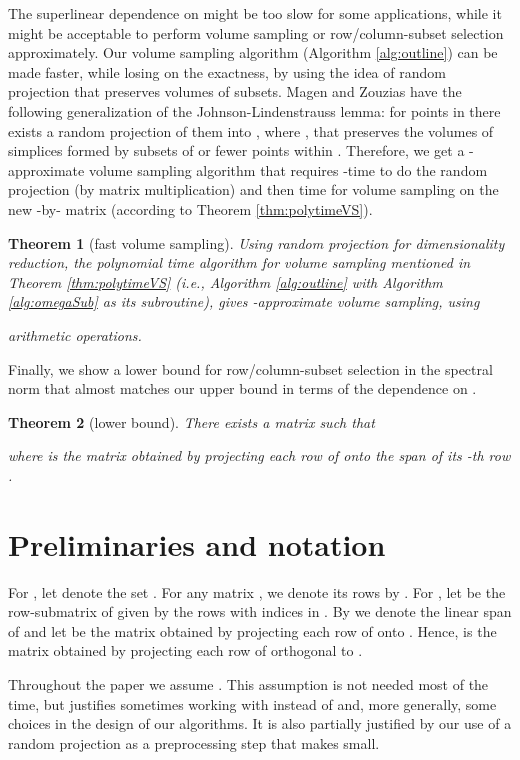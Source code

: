 \documentclass[11pt]{article}
\newtheorem{theorem}{Theorem}
\begin{document}
The superlinear dependence on  might be too slow for some applications, while it might be acceptable to perform volume sampling or row/column-subset selection approximately. Our volume sampling algorithm (Algorithm \ref{alg:outline}) can be made faster, while losing on the exactness, by using the idea of random projection that preserves volumes of subsets. Magen and Zouzias \cite{MZ} have the following generalization of the Johnson-Lindenstrauss lemma: for  points in  there exists a random projection of them into , where , that preserves the volumes of simplices formed by subsets of  or fewer points within . Therefore, we get a -approximate volume sampling algorithm that requires -time to do the random projection (by matrix multiplication) and then  time for volume sampling on the new -by- matrix (according to Theorem \ref{thm:polytimeVS}).

\begin{theorem}[fast volume sampling] \label{thm:fast-VS}
Using random projection for dimensionality reduction, the polynomial time algorithm for volume sampling mentioned in Theorem \ref{thm:polytimeVS} (i.e., Algorithm \ref{alg:outline} with Algorithm \ref{alg:omegaSub} as its subroutine), gives -approximate volume sampling, using

arithmetic operations.
\end{theorem}

Finally, we show a lower bound for row/column-subset selection in the spectral norm that almost matches our upper bound in terms of the dependence on .
\begin{theorem}[lower bound] \label{thm:lower-bound}
There exists a matrix  such that

where  is the matrix obtained by projecting each row of  onto the span of its -th row .
\end{theorem}


\section{Preliminaries and notation}\label{sec:prelim}
For , let  denote the set . For any matrix , we denote its rows by . For , let  be the row-submatrix of  given by the rows with indices in . By  we denote the linear span of  and let  be the matrix obtained by projecting each row of  onto . Hence,  is the matrix obtained by projecting each row of  orthogonal to .

Throughout the paper we assume . This assumption is not needed most of the time, but justifies sometimes working with  instead of  and, more generally, some choices in the design of our algorithms. It is also partially justified by our use of a random projection as a preprocessing step that makes  small.
\end{document}
